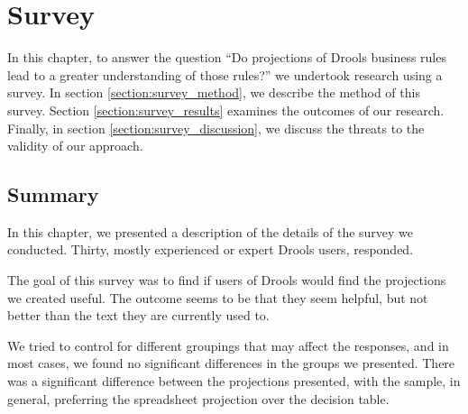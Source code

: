 \chapter{Survey}
\label{chapter:Survey}

In this chapter, to answer the question ``Do projections of Drools business rules lead to a greater understanding of those rules?'' we undertook research using a survey.
In section \ref{section:survey_method}, we describe the method of this survey.
Section \ref{section:survey_results} examines the outcomes of our research.
Finally, in section \ref{section:survey_discussion}, we discuss the threats to the validity of our approach.





\section{Summary}
In this chapter, we presented a description of the details of the survey we conducted.
Thirty, mostly experienced or expert Drools users, responded. 

The goal of this survey was to find if users of Drools would find the projections we created useful.
The outcome seems to be that they seem helpful, but not better than the text they are currently used to.

We tried to control for different groupings that may affect the responses, and in most cases, we found no significant differences in the groups we presented.
There was a significant difference between the projections presented, with the sample, in general, preferring the spreadsheet projection over the decision table. 
